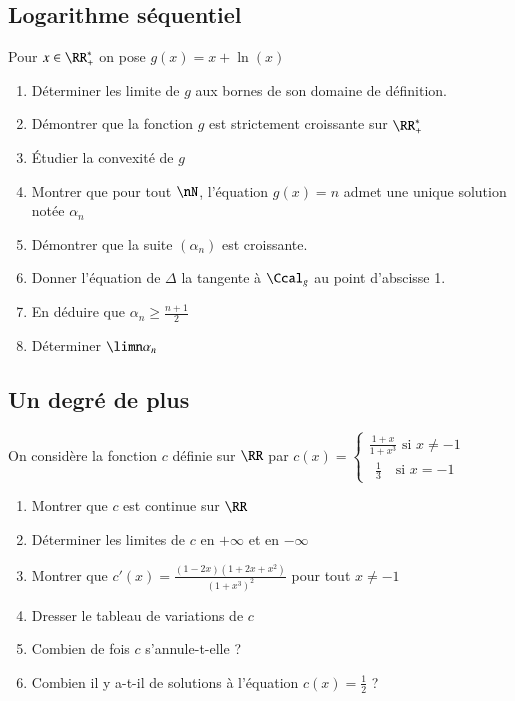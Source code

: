 \documentclass[oneside,12pt]{article}          %
\begin{document}
\subsection{Logarithme séquentiel}
Pour $x\in\RR^*_+$ on pose $g(x)=x+\ln(x)$
\begin{enumerate}
	\item Déterminer les limite de $g$ aux bornes de son domaine de définition.
	\item Démontrer que la fonction $g$ est strictement croissante sur $\RR^*_+$
	\item Étudier la convexité de $g$
	\item Montrer que pour tout $\nN$, l'équation $g(x)=n$ admet une unique solution notée $\alpha_n$
	\item Démontrer que la suite $(\alpha_n)$ est croissante.
	\item Donner l'équation de $\Delta$ la tangente à $\Ccal_g$ au point d'abscisse 1.
	\item En déduire que $\alpha_n\geq\frac{n+1}{2}$
	\item Déterminer $\limn\alpha_n$
\end{enumerate}



\subsection{Un degré de plus}
On considère la fonction $c$ définie sur $\RR$ par $c(x)=\begin{cases}\frac{1+x}{1+x^3} \text{ si } x\neq-1 \\~~ \frac{1}{3} \text{~~ si } x=-1\end{cases}$
\begin{enumerate}
	\item Montrer que $c$ est continue sur $\RR$
    \item Déterminer les limites de $c$ en $+\infty$ et en $-\infty$
    \item Montrer que $c'(x)=\frac{(1-2x)(1+2x+x^2)}{(1+x^3)^2}$ pour tout $x\neq-1$
    \item Dresser le tableau de variations de $c$
    \item Combien de fois $c$ s'annule-t-elle ?
    \item Combien il y a-t-il de solutions à l'équation $c(x)=\frac{1}{2}$ ?
\end{enumerate}
\end{document}
